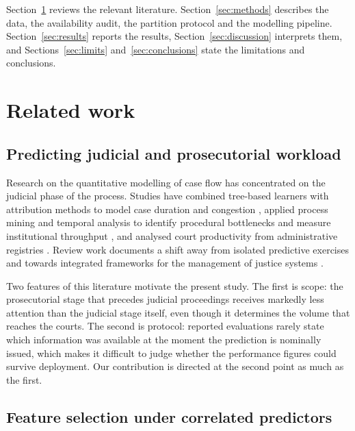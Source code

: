 \documentclass[sn-vancouver,Numbered]{sn-jnl}
\begin{document}
Section~\ref{sec:related} reviews the relevant literature. Section~\ref{sec:methods} describes the data, the availability audit, the partition protocol and the modelling pipeline. Section~\ref{sec:results} reports the results, Section~\ref{sec:discussion} interprets them, and Sections~\ref{sec:limits} and~\ref{sec:conclusions} state the limitations and conclusions.

\section{Related work}\label{sec:related}

\subsection{Predicting judicial and prosecutorial workload}

Research on the quantitative modelling of case flow has concentrated on the judicial phase of the process. Studies have combined tree-based learners with attribution methods to model case duration and congestion \cite{azaria_alleviating_2024}, applied process mining and temporal analysis to identify procedural bottlenecks and measure institutional throughput \cite{pernici_improving_2024}, and analysed court productivity from administrative registries \cite{vasconcelos_analysis_2023}. Review work documents a shift away from isolated predictive exercises and towards integrated frameworks for the management of justice systems \cite{hannoon_artificial_2025}.

Two features of this literature motivate the present study. The first is scope: the prosecutorial stage that precedes judicial proceedings receives markedly less attention than the judicial stage itself, even though it determines the volume that reaches the courts. The second is protocol: reported evaluations rarely state which information was available at the moment the prediction is nominally issued, which makes it difficult to judge whether the performance figures could survive deployment. Our contribution is directed at the second point as much as the first.

\subsection{Feature selection under correlated predictors}
\end{document}
